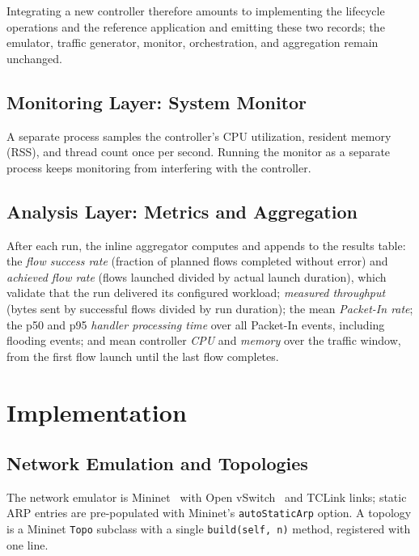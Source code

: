 \documentclass[conference]{IEEEtran}
\begin{document}
Integrating a new controller therefore amounts to implementing
the lifecycle operations and the reference application and emitting
these two records; the
emulator, traffic generator, monitor, orchestration, and
aggregation remain unchanged.

\subsection{Monitoring Layer: System Monitor}

A separate process samples the controller's CPU utilization,
resident memory (RSS), and thread count once per second. Running
the monitor as a separate process keeps monitoring from
interfering with the controller.

\subsection{Analysis Layer: Metrics and Aggregation}

After each run, the inline aggregator computes and appends to the
results table: the \emph{flow success rate} (fraction of planned
flows completed without error) and \emph{achieved flow rate}
(flows launched divided by actual launch duration), which validate
that the run delivered its configured workload; \emph{measured
throughput} (bytes sent by successful flows divided by run
duration); the mean \emph{Packet-In rate}; the p50 and p95
\emph{handler processing time} over all Packet-In events,
including flooding events; and mean controller \emph{CPU} and
\emph{memory} over the traffic window, from the first flow launch
until the last flow completes.

\section{Implementation}
\label{sec:impl}

\subsection{Network Emulation and Topologies}

The network emulator is Mininet~\cite{Lantz2010Mininet} with
Open vSwitch~\cite{ovs} and TCLink links; static ARP entries are
pre-populated with Mininet's \texttt{autoStaticArp} option. A
topology is a Mininet \texttt{Topo} subclass with a single
\texttt{build(self, n)} method, registered with one line.
\end{document}
